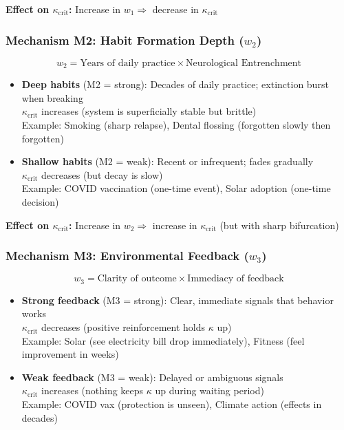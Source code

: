 \documentclass[11pt, a4paper]{article}
\begin{document}
\textbf{Effect on $\kappa_{\text{crit}}$:} Increase in $w_1 \Rightarrow$ decrease in $\kappa_{\text{crit}}$

\subsubsection{Mechanism M2: Habit Formation Depth ($w_2$)}

\begin{equation}
w_2 = \text{Years of daily practice} \times \text{Neurological Entrenchment}
\end{equation}

\begin{itemize}
    \item \textbf{Deep habits} (M2 = strong):
    Decades of daily practice; extinction burst when breaking
    \\ $\kappa_{\text{crit}}$ increases (system is superficially stable but brittle)
    \\ Example: Smoking (sharp relapse), Dental flossing (forgotten slowly then forgotten)

    \item \textbf{Shallow habits} (M2 = weak):
    Recent or infrequent; fades gradually
    \\ $\kappa_{\text{crit}}$ decreases (but decay is slow)
    \\ Example: COVID vaccination (one-time event), Solar adoption (one-time decision)
\end{itemize}

\textbf{Effect on $\kappa_{\text{crit}}$:} Increase in $w_2 \Rightarrow$ increase in $\kappa_{\text{crit}}$
(but with sharp bifurcation)

\subsubsection{Mechanism M3: Environmental Feedback ($w_3$)}

\begin{equation}
w_3 = \text{Clarity of outcome} \times \text{Immediacy of feedback}
\end{equation}

\begin{itemize}
    \item \textbf{Strong feedback} (M3 = strong):
    Clear, immediate signals that behavior works
    \\ $\kappa_{\text{crit}}$ decreases (positive reinforcement holds $\kappa$ up)
    \\ Example: Solar (see electricity bill drop immediately), Fitness (feel improvement in weeks)

    \item \textbf{Weak feedback} (M3 = weak):
    Delayed or ambiguous signals
    \\ $\kappa_{\text{crit}}$ increases (nothing keeps $\kappa$ up during waiting period)
    \\ Example: COVID vax (protection is unseen), Climate action (effects in decades)
\end{itemize}
\end{document}
